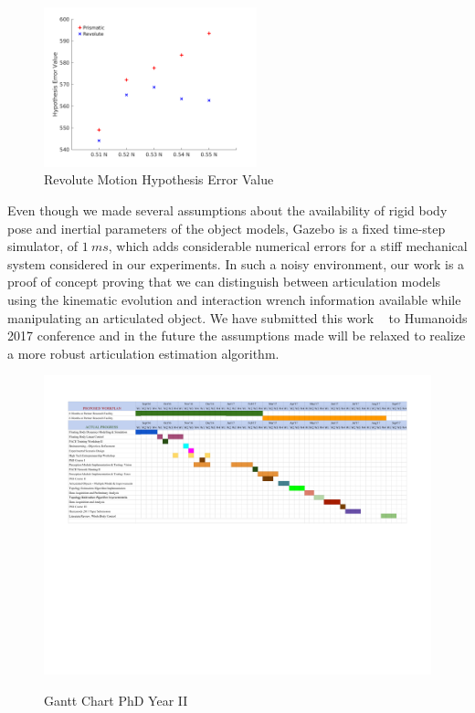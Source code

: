\documentclass[12pt,a4paper]{report}
\begin{document}
\begin{figure}[H]
  \centering
  \includegraphics[width=0.55\textwidth]{figures/rhypdiff.png}
  \caption{Revolute Motion Hypothesis Error Value}
  \label{rhypdiff}
\end{figure}

Even though we made several assumptions about the availability of rigid body pose and inertial parameters of the object models, Gazebo is a fixed time-step simulator, of $1~ms$, which adds considerable numerical errors for a stiff mechanical  system considered in our experiments. In such a noisy environment, our work is a proof of concept proving that we can distinguish between articulation models using the kinematic evolution and interaction wrench information available while manipulating an articulated object. We have submitted  this work ~\cite{momentumTopology2017} to Humanoids 2017 conference and in the future the assumptions made will be relaxed to realize a more robust articulation estimation algorithm.



\begin{landscape}
	\begin{figure}[!ht]
		\centering
		\caption{Gantt Chart PhD Year II}
		\includegraphics[scale=1]{PhD_year2_gantt.pdf}
		\label{gantt}
	\end{figure}
\end{landscape}
\end{document}
